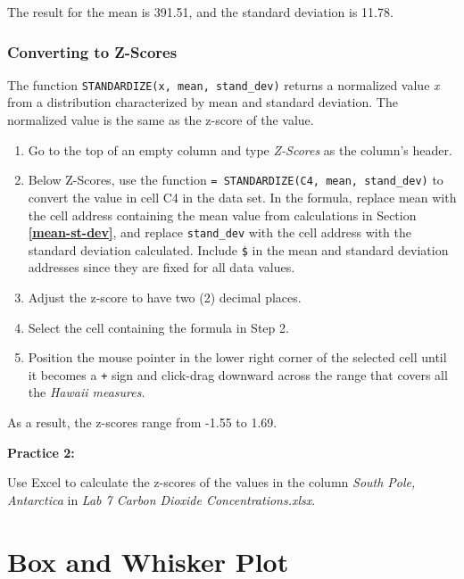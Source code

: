 \documentclass[
]{book}
\providecommand{\tightlist}{%
  \setlength{\itemsep}{0pt}\setlength{\parskip}{0pt}}
\begin{document}
The result for the mean is 391.51, and the standard deviation is 11.78.

\hypertarget{converting-to-z-scores}{%
\subsection{Converting to Z-Scores}\label{converting-to-z-scores}}

The function \texttt{STANDARDIZE(x,\ mean,\ stand\_dev)} returns a normalized value \emph{x} from a distribution characterized by mean and standard deviation. The normalized value is the same as the z-score of the value.

\begin{enumerate}
\def\labelenumi{\arabic{enumi}.}
\tightlist
\item
  Go to the top of an empty column and type \emph{Z-Scores} as the column's header.
\item
  Below Z-Scores, use the function \texttt{=\ STANDARDIZE(C4,\ mean,\ stand\_dev)} to convert the value in cell C4 in the data set. In the formula, replace mean with the cell address containing the mean value from calculations in Section \textbf{\ref{mean-st-dev}}, and replace \texttt{stand\_dev} with the cell address with the standard deviation calculated. Include \texttt{\$} in the mean and standard deviation addresses since they are fixed for all data values.
\item
  Adjust the z-score to have two (2) decimal places.
\item
  Select the cell containing the formula in Step 2.
\item
  Position the mouse pointer in the lower right corner of the selected cell until it becomes a \texttt{+} sign and click-drag downward across the range that covers all the \emph{Hawaii measures}.
\end{enumerate}

As a result, the z-scores range from -1.55 to 1.69.

\textbf{Practice 2:}

Use Excel to calculate the z-scores of the values in the column \emph{South Pole, Antarctica} in \emph{Lab 7 Carbon Dioxide Concentrations.xlsx}.

\hypertarget{box-and-whisker-plot}{%
\chapter{Box and Whisker Plot}\label{box-and-whisker-plot}}
\end{document}
